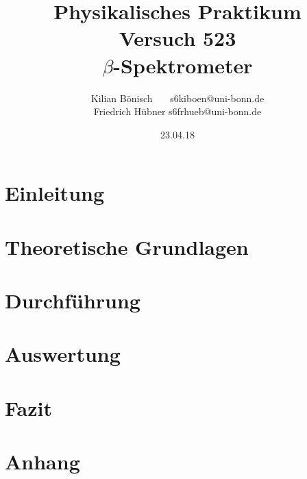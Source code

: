 \documentclass{article}
\newcommand{\RM}[1]{\MakeUppercase{\romannumeral #1}}
\begin{document}
\setlength{\parindent}{0em}   %
\title{Physikalisches Praktikum \RM{5}\\Versuch 523\\$\beta$-Spektrometer}
\author{Kilian Bönisch \ \ \ \qquad s6kiboen@uni-bonn.de \\
  Friedrich Hübner \qquad s6frhueb@uni-bonn.de }
\date{23.04.18}

\maketitle
\thispagestyle{empty}

\newpage

\thispagestyle{empty}

\tableofcontents

\newpage

\section{Einleitung}



\section{Theoretische Grundlagen}



\section{Durchführung}





\section{Auswertung}







\section{Fazit}



\FloatBarrier

\newpage

\printbibliography

\newpage

\section{Anhang}

\end{document}
